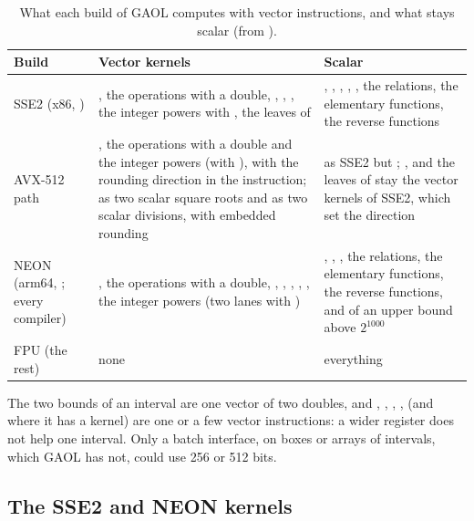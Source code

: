 \begin{table}[htbp]
\centering\footnotesize
\caption[What each build of GAOL computes with vector instructions]{What each build of GAOL computes with vector instructions, and what stays scalar (from ).} \label{tab:computing-kernels}
\begin{tabular}{|L{3.6cm}|L{4.8cm}|L{4.5cm}|}
\hline
\textbf{Build} & \textbf{Vector kernels} & \textbf{Scalar} \\
\hline
SSE2 (x86, ) &
, the operations with a double, ,
\code{\%=}, , the integer powers with , the
leaves of  &
, \code{\&=}, \code{|=}, , , the
relations, the elementary functions, the reverse functions \\
\hline
AVX-512 path &
, the operations with a double and the integer powers
(with ), with the rounding direction in the instruction;
 as two scalar square roots and \code{/} as two scalar divisions,
with embedded rounding &
as SSE2 but ; , \code{\%=} and the leaves of  stay the vector kernels of SSE2, which set the direction \\
\hline
NEON (arm64, ; every compiler) &
, the operations with a double, \code{\%=},
, \code{\&=}, \code{|=}, , the integer powers (two
lanes with ) &
, , , the relations, the elementary functions, the reverse functions, and  of an upper bound above $2^{1000}$ \\
\hline
FPU (the rest) & none & everything \\
\hline
\end{tabular}

\end{table}

\begin{Rem}
The two bounds of an interval are one vector of two doubles, and \code{+},
\code{-}, \code{*}, \code{/},  (and  where it has a
kernel) are one or a few vector instructions: a wider register does not help
one interval. Only a batch interface, on boxes or arrays of intervals, which
GAOL has not, could use 256 or 512 bits.
\end{Rem}

\subsection{The SSE2 and NEON kernels}

